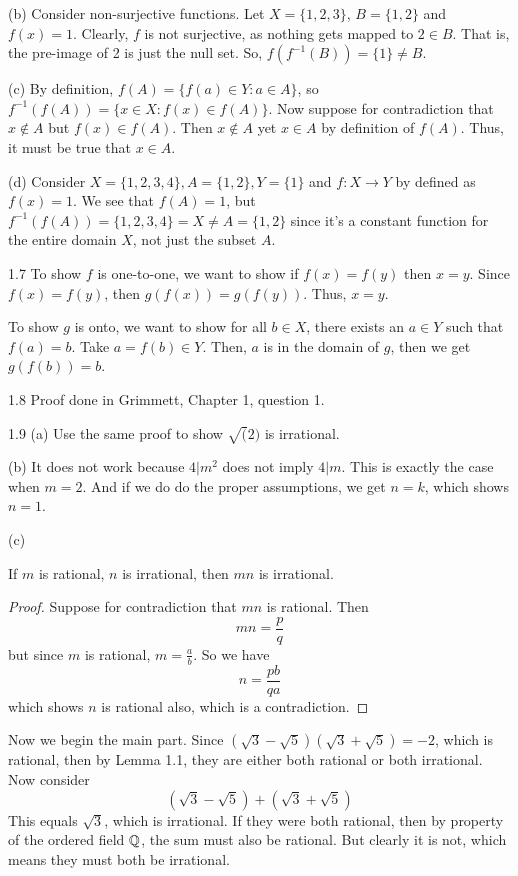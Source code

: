 (b) Consider non-surjective functions. Let $X = \{1,2,3\}$, $B = \{1,2\}$ and $f(x)=1$. Clearly, $f$ is not surjective,
as nothing gets mapped to $2\in B$. That is, the pre-image of 2 is just the null set. So, $f(f^{-1}(B))=\{1\} \neq B$.

(c) By definition, $f(A)=\{f(a) \in Y : a \in A\}$, so $f^{-1}(f(A))=\{x \in X : f(x) \in f(A)\}$.
Now suppose for contradiction that $x \notin A$ but $f(x) \in f(A)$. Then $x \notin A$ yet $x \in A$ by definition of $f(A)$.
Thus, it must be true that $x \in A$.

(d) Consider $X=\{1,2,3,4\}, A=\{1,2\}, Y=\{1\}$ and $f:X\rightarrow Y$ by defined as $f(x)=1$. We see that $f(A)=1$, but $f^{-1}(f(A))=\{1,2,3,4\} = X\neq A = \{1,2\}$ since it's a constant function for the entire domain $X$, not just the subset $A$.

1.7 To show $f$ is one-to-one, we want to show if $f(x)=f(y)$ then $x=y$. Since $f(x)=f(y)$, then $g(f(x))=g(f(y))$. Thus, $x=y$.

To show $g$ is onto, we want to show for all $b \in X$, there exists an $a \in Y$ such that $f(a)=b$. Take
$a=f(b) \in Y$. Then, $a$ is in the domain of $g$, then we get $g(f(b))=b$.

1.8 Proof done in Grimmett, Chapter 1, question 1.

1.9 (a) Use the same proof to show $\sqrt(2)$ is irrational.

(b) It does not work because $4|m^2$ does not imply $4|m$. This is exactly the case when $m=2$. And if we do do the proper assumptions,
we get $n=k$, which shows $n=1$.

(c) \begin{lemma}
    If $m$ is rational, $n$ is irrational, then $mn$ is irrational.
\end{lemma}

\begin{proof}
    Suppose for contradiction that $mn$ is rational. Then \[ mn=\frac{p}{q} \] but since $m$ is rational, $m=\frac{a}{b}$. 
    So we have \[n = \frac{pb}{qa}\] which shows $n$ is rational also, which is a contradiction.
\end{proof}

Now we begin the main part. Since $(\sqrt{3}-\sqrt{5})(\sqrt{3}+\sqrt{5})=-2$, which is rational, then by Lemma 1.1,  
they are either both rational or both irrational. Now consider \[(\sqrt{3}-\sqrt{5})+(\sqrt{3}+\sqrt{5})\]
This equals $\sqrt{3}$, which is irrational. If they were both rational, then by property of the ordered field $\mathbb{Q}$, the sum must also be rational. But clearly it is not,
which means they must both be irrational.

